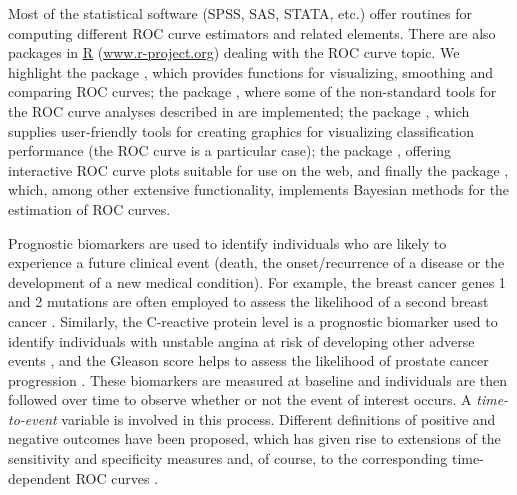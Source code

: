 Most of the statistical software (SPSS, SAS, STATA, etc.) offer routines for computing different ROC curve estimators and related elements. There are also packages in \url{R} (\url{www.r-project.org}) dealing with the ROC curve topic. We highlight the  package \citep{robin11},  which provides functions for visualizing, smoothing and comparing ROC curves; the package  \citep{nsROC}, where some of the non-standard tools for the ROC curve analyses described in \citet{Perez-Fernandez2018}  are implemented; the package  \citep{ROCR}, which supplies user-friendly tools for creating graphics for visualizing classification performance (the ROC curve is a particular case); the  package \citep{Sachs2017}, offering interactive ROC curve plots suitable for use on the web, and finally the  package \citep{Cote2021}, which, among other extensive functionality, implements Bayesian methods for the estimation of ROC curves.

Prognostic biomarkers are used to identify individuals who are likely to experience a future clinical event (death, the onset/recurrence of a disease or the development of a new medical condition). For example, the breast cancer genes 1 and 2 mutations are often employed to assess the likelihood of a second breast cancer \citep{Basu2015}. Similarly, the C-reactive protein level is a prognostic biomarker used to identify individuals with unstable angina at risk of developing other adverse events \citep{Ferreiros1999}, and the Gleason score helps to assess the likelihood of prostate cancer progression \citep{Epstein2016}. These biomarkers are measured at baseline and individuals are then followed over time to observe whether or not the event of interest occurs. 
A {\it{time-to-event}} variable is involved in this process. Different definitions of positive and negative outcomes have been proposed, which has given rise to extensions of the sensitivity and specificity measures and, of course, to the corresponding time-dependent ROC curves \citep{Etzioni99} .

